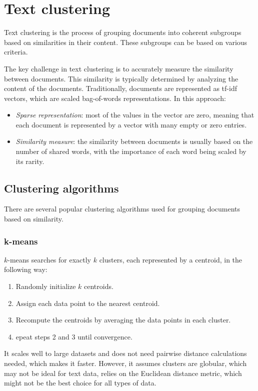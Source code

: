 \section{Text clustering}

Text clustering is the process of grouping documents into coherent subgroups based on similarities in their content. 
These subgroups can be based on various criteria.

The key challenge in text clustering is to accurately measure the similarity between documents. 
This similarity is typically determined by analyzing the content of the documents.
Traditionally, documents are represented as tf-idf vectors, which are scaled bag-of-words representations.
In this approach:
\begin{itemize}
    \item \textit{Sparse representation}: most of the values in the vector are zero, meaning that each document is represented by a vector with many empty or zero entries.
    \item \textit{Similarity measure}: the similarity between documents is usually based on the number of shared words, with the importance of each word being scaled by its rarity.
\end{itemize}

\subsection{Clustering algorithms}
There are several popular clustering algorithms used for grouping documents based on similarity.

\subsubsection{k-means}
$k$-means searches for exactly $k$ clusters, each represented by a centroid, in the following way: 
\begin{enumerate}
    \item Randomly initialize $k$ centroids.
    \item Assign each data point to the nearest centroid.
    \item Recompute the centroids by averaging the data points in each cluster.
    \item epeat steps 2 and 3 until convergence.
\end{enumerate}
\noindent It scales well to large datasets and does not need pairwise distance calculations needed, which makes it faster.
However, it assumes clusters are globular, which may not be ideal for text data, relies on the Euclidean distance metric, which might not be the best choice for all types of data.

